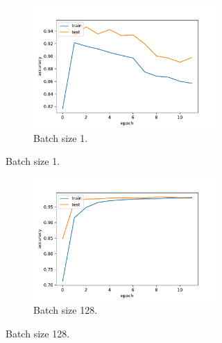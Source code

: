 \documentclass[10 pt, a4paper]{article}
\begin{document}
\begin{figure}[H] 
\begin{subfigure}[b]{0.33\textwidth}
\begin{figure}[H]
\includegraphics[width=\textwidth]{AccCNN1}
\caption{Batch size 1.}
\label{fig:AccCNN1}
\end{figure}
\end{subfigure}
\begin{subfigure}[b]{0.33\textwidth}
\begin{figure}[H]
\includegraphics[width=\textwidth]{AccCNN128}
\caption{Batch size 128.}
\label{fig:AccCNN128}
\end{figure}
\end{subfigure}
\begin{subfigure}[b]{0.33\textwidth}
\begin{figure}[H] 

\end{figure}
\end{subfigure}
\end{figure}
\end{document}
